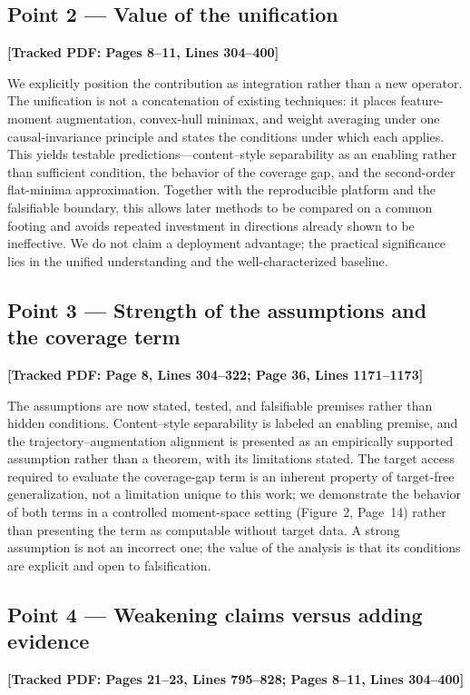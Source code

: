 \documentclass[11pt]{article}
\newcommand{\loc}[1]{\textbf{[\textcolor{revblue}{Tracked PDF: #1}]}}
\begin{document}
\subsection*{Point 2 --- Value of the unification}
\loc{Pages 8--11, Lines 304--400}

We explicitly position the contribution as integration rather than a new
operator. The unification is not a concatenation of existing techniques: it
places feature-moment augmentation, convex-hull minimax, and weight averaging
under one causal-invariance principle and states the conditions under which
each applies. This yields testable predictions---content--style separability as
an enabling rather than sufficient condition, the behavior of the coverage
gap, and the second-order flat-minima approximation. Together with the
reproducible platform and the falsifiable boundary, this allows later methods
to be compared on a common footing and avoids repeated investment in directions
already shown to be ineffective. We do not claim a deployment advantage; the
practical significance lies in the unified understanding and the
well-characterized baseline.

\subsection*{Point 3 --- Strength of the assumptions and the coverage term}
\loc{Page 8, Lines 304--322; Page 36, Lines 1171--1173}

The assumptions are now stated, tested, and falsifiable premises rather than
hidden conditions. Content--style separability is labeled an enabling premise,
and the trajectory--augmentation alignment is presented as an empirically
supported assumption rather than a theorem, with its limitations stated. The
target access required to evaluate the coverage-gap term is an inherent
property of target-free generalization, not a limitation unique to this work; we
demonstrate the behavior of both terms in a controlled moment-space setting
(Figure~2, Page~14) rather than presenting the term as computable without
target data. A strong assumption is not an incorrect one; the value of the
analysis is that its conditions are explicit and open to falsification.

\subsection*{Point 4 --- Weakening claims versus adding evidence}
\loc{Pages 21--23, Lines 795--828; Pages 8--11, Lines 304--400}
\end{document}
